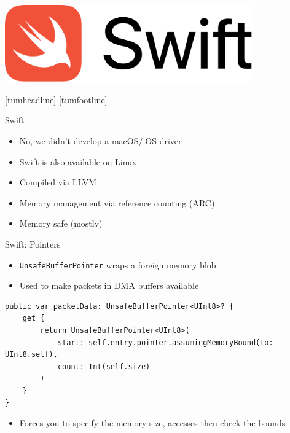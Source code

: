 \documentclass[NET,english,aspectratio=169,notitleframe]{tumbeamer}
\begin{document}

\begin{frame}{}
\centering\includegraphics[width=0.8\textwidth]{pics/swift}
\end{frame}
[tumheadline]
[tumfootline]

\begin{frame}{Swift}
\begin{itemize}
\item No, we didn't develop a macOS/iOS driver
\item Swift is also available on Linux
\pause
\vspace{1em}
\item Compiled via LLVM
\item Memory management via reference counting (ARC)
\item Memory safe (mostly)
\end{itemize}
\end{frame}

\begin{frame}[fragile]{Swift: Pointers}
\begin{itemize}
\item \texttt{UnsafeBufferPointer} wraps a foreign memory blob
\item Used to make packets in DMA buffers available
\end{itemize}
\begin{verbatim}
public var packetData: UnsafeBufferPointer<UInt8>? {
    get {
        return UnsafeBufferPointer<UInt8>(
            start: self.entry.pointer.assumingMemoryBound(to: UInt8.self),
            count: Int(self.size)
        )
    }
}
\end{verbatim}
\begin{itemize}
\item Forces you to specify the memory size, accesses then check the bounds
\end{itemize}
\end{frame}
\end{document}
